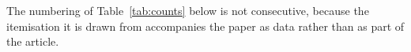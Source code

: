The numbering of Table~\ref{tab:counts} below is not consecutive, because
the itemisation it is drawn from accompanies the paper as data rather than
as part of the article.

\begin{table}
\centering
\scriptsize
\caption{\textbf{The survey ledger, part two: events, dispositions and
confirmation.} Every headline count in this paper is read from here.}
\label{tab:counts}

\end{table}

\begin{table}
\centering
\scriptsize
\caption{\textbf{The \NProjCodes{} ALMA proposals the searched blocks belong
to}, as \mbox{ADS/JAO.ALMA\#\textit{code}}. Every census block belongs to
one.\ProjCodeUnresClause}
\label{tab:projcodes}

\end{table}
